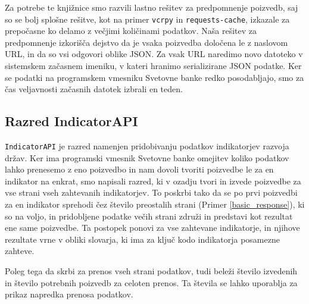 Za potrebe te knjižnice smo razvili lastno rešitev za predpomnenje poizvedb,
saj so se bolj splošne rešitve, kot na primer
\verb|vcrpy| in
\verb|requests-cache|, 
izkazale za prepočasne ko delamo z večjimi količinami podatkov. Naša
rešitev za predpomnenje izkorišča dejstvo da je vsaka poizvedba določena le
z naslovom URL, in da so vsi odgovori oblike JSON. Za vsak URL naredimo novo
datoteko v sistemskem začasnem imeniku, v kateri hranimo serializirane JSON
podatke. Ker se podatki na programskem vmesniku Svetovne banke redko
posodabljajo, smo za čas veljavnosti začasnih datotek izbrali en teden.






\subsection{Razred IndicatorAPI}

\verb|IndicatorAPI| je razred namenjen pridobivanju podatkov indikatorjev
razvoja držav. Ker ima programski vmesnik Svetovne banke omejitev koliko 
podatkov lahko prenesemo z eno poizvedbo in nam dovoli tvoriti poizvedbe le za
en indikator na enkrat, smo napisali razred, ki v ozadju tvori in izvede
poizvedbe za vse strani vseh zahtevanih indikatorjev. To poskrbi tako da se po
prvi poizvedbi za en indikator sprehodi čez število preostalih strani 
(Primer \ref{basic_response}), ki so na voljo, in pridobljene podatke večih
strani združi in predstavi kot rezultat ene same poizvedbe. Ta postopek ponovi
za vse zahtevane indikatorje, in njihove rezultate vrne v obliki slovarja, ki 
ima za ključ kodo indikatorja posamezne zahteve.

Poleg tega da skrbi za prenos vseh strani podatkov, tudi beleži število 
izvedenih in število potrebnih poizvedb za celoten prenos. Ta števila se
lahko uporablja za prikaz napredka prenosa podatkov.


